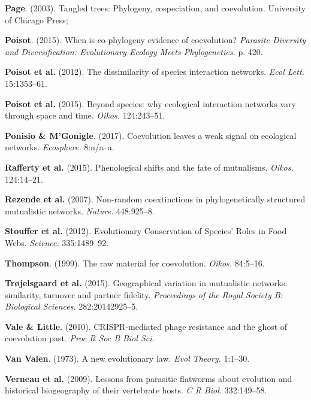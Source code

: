 \documentclass[11pt,serif]{article}
\begin{document}
\hypertarget{ref-page03ttp}{}
\textbf{Page}. (2003). Tangled trees: Phylogeny, cospeciation, and
coevolution. University of Chicago Press;

\hypertarget{ref-pois15wce}{}
\textbf{Poisot}. (2015). When is co-phylogeny evidence of coevolution?
\emph{Parasite Diversity and Diversification: Evolutionary Ecology Meets
Phylogenetics.} p. 420.

\hypertarget{ref-pois12dsi}{}
\textbf{Poisot et al.} (2012). The dissimilarity of species interaction
networks. \emph{Ecol Lett.} 15:1353--61.

\hypertarget{ref-pois15swe}{}
\textbf{Poisot et al.} (2015). Beyond species: why ecological
interaction networks vary through space and time. \emph{Oikos.}
124:243--51.

\hypertarget{ref-poni17clw}{}
\textbf{Ponisio \& M'Gonigle}. (2017). Coevolution leaves a weak signal
on ecological networks. \emph{Ecosphere.} 8:n/a--a.

\hypertarget{ref-raff15psf}{}
\textbf{Rafferty et al.} (2015). Phenological shifts and the fate of
mutualisms. \emph{Oikos.} 124:14--21.

\hypertarget{ref-reze07ncp}{}
\textbf{Rezende et al.} (2007). Non-random coextinctions in
phylogenetically structured mutualistic networks. \emph{Nature.}
448:925--8.

\hypertarget{ref-stou12ecs}{}
\textbf{Stouffer et al.} (2012). Evolutionary Conservation of Species'
Roles in Food Webs. \emph{Science.} 335:1489--92.

\hypertarget{ref-thom99rmc}{}
\textbf{Thompson}. (1999). The raw material for coevolution.
\emph{Oikos.} 84:5--16.

\hypertarget{ref-troj15gvm}{}
\textbf{Trøjelsgaard et al.} (2015). Geographical variation in
mutualistic networks: similarity, turnover and partner fidelity.
\emph{Proceedings of the Royal Society B: Biological Sciences.}
282:20142925--5.

\hypertarget{ref-vale10cpr}{}
\textbf{Vale \& Little}. (2010). CRISPR-mediated phage resistance and
the ghost of coevolution past. \emph{Proc R Soc B Biol Sci.}

\hypertarget{ref-van73nel}{}
\textbf{Van Valen}. (1973). A new evolutionary law. \emph{Evol Theory.}
1:1--30.

\hypertarget{ref-vern09lpf}{}
\textbf{Verneau et al.} (2009). Lessons from parasitic flatworms about
evolution and historical biogeography of their vertebrate hosts. \emph{C
R Biol.} 332:149--58.
\end{document}
